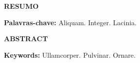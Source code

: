 \begin{center}
  \textbf{RESUMO}
\end{center}

\begin{singlespace}
  \noindent \lipsum[1]
  \bigskip
  \noindent \textbf{Palavras-chave:} Aliquam. Integer. Lacinia.
\end{singlespace}

\begin{center}
  \textbf{ABSTRACT}
\end{center}

\begin{singlespace}
  \noindent \lipsum[2]
  \bigskip
  \noindent \textbf{Keywords:} Ullamcorper. Pulvinar. Ornare.
\end{singlespace}

\vspace{1cm}
